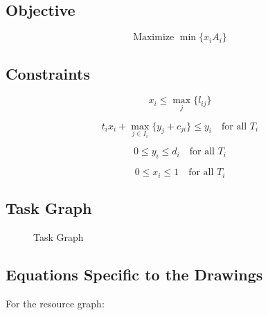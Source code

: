 \documentclass{article}
\begin{document}
\subsection*{Objective}
\begin{equation}
    \text{Maximize } \min \{x_i A_i\}
\end{equation}

\subsection*{Constraints}
\begin{equation}
    x_i \leq \max_j \{l_{ij}\}
\end{equation}

\begin{equation}
    t_i x_i + \max_{j \in I_i} \{y_j + c_{ji}\} \leq y_i \quad \text{for all } T_i
\end{equation}

\begin{equation}
    0 \leq y_i \leq d_i \quad \text{for all } T_i
\end{equation}

\begin{equation}
    0 \leq x_i \leq 1 \quad \text{for all } T_i
\end{equation}

\subsection*{Task Graph}

\begin{figure}[h]
    \centering
    \caption{Task Graph}
    \label{fig:task_graph}
\end{figure}

\subsection*{Equations Specific to the Drawings}

For the resource graph:
\end{document}
